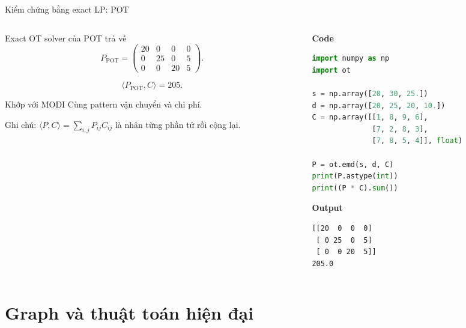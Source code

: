\documentclass[10pt]{beamer}
\begin{document}
\begin{frame}[fragile]{Kiểm chứng bằng exact LP: POT}
    \begin{columns}[c]
        \begin{column}{0.44\textwidth}
            Exact OT solver của POT trả về
            \[
                P_{\text{POT}}=
                \begin{pmatrix}
                    20 & 0 & 0 & 0\\
                    0 & 25 & 0 & 5\\
                    0 & 0 & 20 & 5
                \end{pmatrix}.
            \]

            \[
                \langle P_{\text{POT}}, C\rangle = 205.
            \]

            \begin{block}{Khớp với MODI}
                Cùng pattern vận chuyển và chi phí.
            \end{block}

            {\scriptsize Ghi chú: $\langle P,C\rangle=\sum_{i,j}P_{ij}C_{ij}$ là nhân từng phần tử rồi cộng lại.}
        \end{column}
        \begin{column}{0.52\textwidth}
            \textbf{Code}
            \begin{lstlisting}[language=Python,basicstyle=\ttfamily\tiny]
import numpy as np
import ot

s = np.array([20, 30, 25.])
d = np.array([20, 25, 20, 10.])
C = np.array([[1, 8, 9, 6],
              [7, 2, 8, 3],
              [7, 8, 5, 4]], float)

P = ot.emd(s, d, C)
print(P.astype(int))
print((P * C).sum())
            \end{lstlisting}
            \textbf{Output}
            \begin{lstlisting}[basicstyle=\ttfamily\tiny]
[[20  0  0  0]
 [ 0 25  0  5]
 [ 0  0 20  5]]
205.0
            \end{lstlisting}
        \end{column}
    \end{columns}
\end{frame}

\section{Graph và thuật toán hiện đại}
\end{document}
